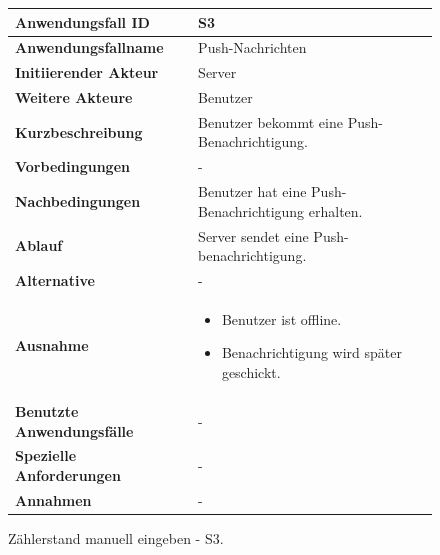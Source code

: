 \newpage

\begin{figure}[H]
	\centering
	\begin{tabularx}{\textwidth}{ X | X }
		\textbf{Anwendungsfall ID} & S3 \\ \hline
		\textbf{Anwendungsfallname} & Push-Nachrichten \\ \hline
		\textbf{Initiierender Akteur} & Server \\ \hline
		\textbf{Weitere Akteure} & Benutzer \\ \hline
		\textbf{Kurzbeschreibung} & Benutzer bekommt eine Push-Benachrichtigung. \\ \hline
		\textbf{Vorbedingungen} & - \\ \hline
		\textbf{Nachbedingungen} & Benutzer hat eine Push-Benachrichtigung erhalten. \\ \hline
		\textbf{Ablauf} & Server sendet eine Push-benachrichtigung. \\ \hline
		\textbf{Alternative} & - \\ \hline
		\textbf{Ausnahme} &
		\begin{itemize}
			\item Benutzer ist offline.
			\item Benachrichtigung wird später geschickt.
		\end{itemize} \\ \hline
		\textbf{Benutzte Anwendungsfälle} & - \\ \hline
		\textbf{Spezielle Anforderungen} & - \\ \hline
		\textbf{Annahmen} & -
	\end{tabularx}
	\caption{Zählerstand manuell eingeben - S3.}
	\label{fig:anwendungsfall-server-tabelle-xx-1}
\end{figure}